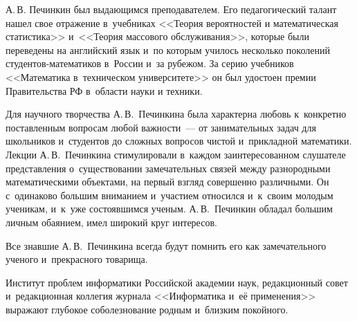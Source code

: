 А.\,В. Печинкин был выдающимся преподавателем. Его педагогический талант нашел
свое отражение в~учебниках <<Теория вероятностей и математическая статистика>>
и~<<Теория массового обслуживания>>, которые были переведены на английский язык
и~по которым училось несколько поколений сту\-ден\-тов-ма\-те\-ма\-ти\-ков в~России и~за
рубежом. За серию учебников <<Математика в~техническом университете>>
он был удостоен премии Правительства РФ в~области науки и техники.

Для научного творчества А.\,В.~Печинкина была характерна любовь к~конкретно
поставленным вопросам любой важности~--- от занимательных задач для школьников
и~студентов до сложных вопросов чистой и~прикладной математики.
Лекции А.\,В.~Печинкина стимулировали в~каждом заинтересованном
слушателе представления о~существовании замечательных связей между
разнородными математическими объектами, на первый взгляд совершенно различными.
Он с~одинаково большим вниманием и~участием относился и~к~своим молодым ученикам,
и~к~уже состоявшимся ученым. А.\,В.~Печинкин обладал большим личным обаянием,
имел широкий круг интересов.

Все знавшие А.\,В.~Печинкина всегда будут помнить его как замечательного ученого
и~прекрасного товарища.

\smallskip
Институт проблем информатики Российской академии наук, редакционный совет
и~редакционная коллегия журнала <<Информатика и~её применения>>
выражают глубокое соболезнование родным и~близким покойного.